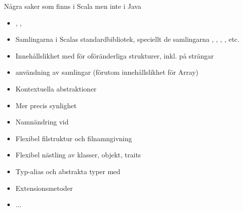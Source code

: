 \begin{Slide}{Några saker som finns i Scala men inte i Java}
\begin{multicols}{2}
\begin{itemize}
\item {}, , 

\item Samlingarna i Scalas standardbibliotek, speciellt de  samlingarna , , , , etc.

\item Innehållslikhet med \code{==} för oföränderliga strukturer, inkl. \code{< <= > >= } på strängar

\item {} användning av samlingar  (förutom innehållslikhet för Array)

\item Kontextuella abstraktioner  

\item Mer precis synlighet 

\item Namnändring vid 

\item Flexibel filstruktur och filnamngivning

\item Flexibel nästling av klasser, objekt, traits

\item Typ-alias och abstrakta typer med 

\item Extensionsmetoder 

\item ...
\end{itemize}
\ifkompendium\else
\end{multicols}
\fi
\end{Slide}



